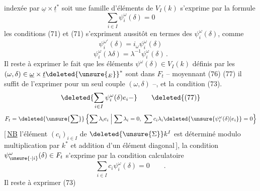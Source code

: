 indexée par $\underline\omega\times\underline t^*$ soit une famille d'éléments de $V_I(k)$ s'exprime par la formule
\[
\sum_{i\in I}\psi_i^\omega(\delta)=0 \tag*{(75)}
\]
les  conditions (71) et (71) s'expriment aussitôt en termes des $\psi_i^\omega(\delta)$, comme
\[
\psi_i^{\omega'}(\delta)=i_\omega\psi_i^\omega(\delta) \tag*{(76)}
\]
\[
\psi_i^\omega(\lambda\delta)=\lambda^{-1}\psi_i^\omega(\delta)\,. \tag*{(77)}
\]
Il reste à exprimer le fait que les éléments $\psi^\omega(\delta)\in V_I(k)$ définis par les $(\omega,\delta)\in\underline\omega\times\underline t\deleted{\unsure{_E}}^*$ sont dans $F_t$ -- moyennant (76) (77) il suffit de l'exprimer pour un seul couple $(\omega,\delta)$ --, et la condition (73). 
\[
\deleted{\sum_{i\in I}\psi_i^\omega(\delta)e_i-}\tag*{\deleted{(77)}}
\]
\[
F_t=\deleted{\unsure{\sum}}\left\{\sum\lambda_ie_i\mathrel{}\middle|\mathrel{}\sum\lambda_i=0,\ 
\sum c_i\lambda_i\deleted{\unsure{\psi_i^\omega(\delta)|e_i}}=0\right\}
\]
[\,\uline{NB} l'élément $(c_i)_{i\in I}$ de $\deleted{\unsure{\Sigma}}k^I$ est déterminé modulo multiplication par $k^*$ et addition d'un élément diagonal\,], la condition $\psi_{\unsure{\cdot|i}}^\omega(\delta)\in F_t$ s'exprime par la condition calculatoire
\[
\sum_{i\in I}c_i\psi_i^\omega(\delta)=0\qquad . \tag*{(78)}
\]
Il reste  à exprimer (73)
